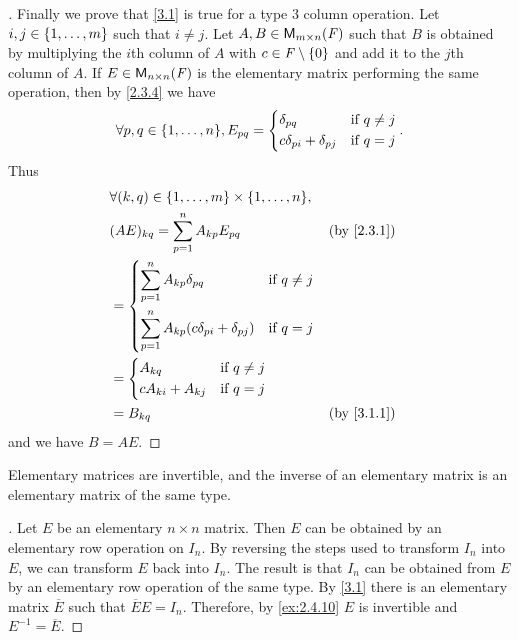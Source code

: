 \begin{proof}[]
	Finally we prove that \cref{3.1} is true for a type 3 column operation.
	Let \(i, j \in \left\lbrace1, \dots, m\right\rbrace\) such that \(i \neq j\).
	Let \(A, B \in \ms\) such that \(B\) is obtained by multiplying the \(i\)th column of \(A\) with \(c \in \mathit{F} \setminus \left\lbrace0\right\rbrace\) and add it to the \(j\)th column of \(A\).
	If \(E \in \ms[n][n][\F]\) is the elementary matrix performing the same operation, then by \cref{2.3.4} we have
	\[
		\forall p, q \in \set{1, \dots, n}, E_{p q} = \begin{dcases}
			\delta_{p q}                  & \text{if } q \neq j \\
			c \delta_{p i} + \delta_{p j} & \text{if } q = j
		\end{dcases}.
	\]
	Thus
	\begin{align*}
		 & \forall (k, q) \in \set{1, \dots, m} \times \set{1, \dots, n},                                  \\
		 & (AE)_{k q} = \sum_{p = 1}^n A_{k p} E_{p q}                                     &  & \by{2.3.1} \\
		 & = \begin{dcases}
			     \sum_{p = 1}^n A_{k p} \delta_{p q}                    & \text{if } q \neq j \\
			     \sum_{p = 1}^n A_{k p} (c \delta_{p i} + \delta_{p j}) & \text{if } q = j
		     \end{dcases}                  \\
		 & = \begin{dcases}
			     A_{k q}             & \text{if } q \neq j \\
			     c A_{k i} + A_{k j} & \text{if } q = j
		     \end{dcases}                                                     \\
		 & = B_{k q}                                                                       &  & \by{3.1.1}
	\end{align*}
	and we have \(B = AE\).
\end{proof}

\begin{thm}\label{3.2}
	Elementary matrices are invertible, and the inverse of an elementary matrix is an elementary matrix of the same type.
\end{thm}

\begin{proof}[]
	Let \(E\) be an elementary \(n \times n\) matrix.
	Then \(E\) can be obtained by an elementary row operation on \(I_n\).
	By reversing the steps used to transform \(I_n\) into \(E\), we can transform \(E\) back into \(I_n\).
	The result is that \(I_n\) can be obtained from \(E\) by an elementary row operation of the same type.
	By \cref{3.1} there is an elementary matrix \(\overline{E}\) such that \(\overline{E} E = I_n\).
	Therefore, by \cref{ex:2.4.10} \(E\) is invertible and \(E^{-1} = \overline{E}\).
\end{proof}

